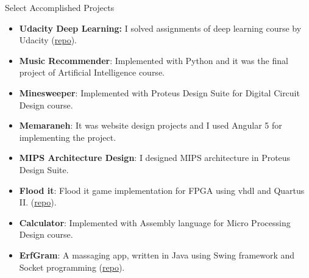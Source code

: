 \documentclass[]{mcdowellcv}
\begin{document}
\begin{cvsection}{Select Accomplished Projects}
\begin{cvsubsection}{}{}{}
\begin{itemize}
        	    \item \textbf{Udacity Deep Learning:} I solved assignments of deep learning course by Udacity
        	    (\href{https://github.com/erfanMhi/Udacity-Deep-Learning-Assignment}{repo}).
        	    \item \textbf{Music Recommender}: Implemented with Python and it was the final project of Artificial Intelligence course.
        	    \item \textbf{Minesweeper}: Implemented with Proteus Design Suite for Digital Circuit Design course.
        	    \item \textbf{Memaraneh}: It was website design projects and I used Angular 5 for implementing the project.
        	    \item \textbf{MIPS Architecture Design}: I designed MIPS architecture in Proteus Design Suite.
        	    \item \textbf{Flood it}: Flood it game implementation for FPGA using vhdl and Quartus II.         	    
                (\href{https://github.com/erfanMhi/Flood-It-in-VHDL}{repo}).
          	    \item \textbf{Calculator}: Implemented with Assembly language for Micro Processing Design course.
        	    \item \textbf{ErfGram}: A massaging app, written in Java using Swing framework and Socket programming (\href{https://github.com/erfanMhi/ErfGram}{repo}).
        	\end{itemize}
	    \end{cvsubsection}

    \end{cvsection}
\end{document}

